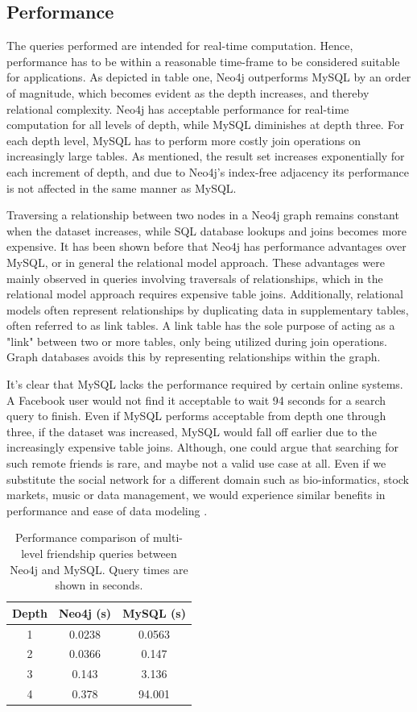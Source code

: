 \documentclass[a4paper, 12pt, conference]{IEEEtran}
\begin{document}
\subsection{Performance}
The queries performed are intended for real-time computation.
Hence, performance has to be within a reasonable time-frame to be considered suitable for applications.
As depicted in table one, Neo4j outperforms MySQL by an order of magnitude, which becomes evident as the depth increases, and thereby relational complexity.
Neo4j has acceptable performance for real-time computation for all levels of depth, while MySQL diminishes at depth three.
For each depth level, MySQL has to perform more costly join operations on increasingly large tables.
As mentioned, the result set increases exponentially for each increment of depth, and due to Neo4j's index-free adjacency its performance is not affected in the same manner as MySQL.

Traversing a relationship between two nodes in a Neo4j graph remains constant when the dataset increases, while SQL database lookups and joins becomes more expensive.
It has been shown before \cite{comparison} that Neo4j has performance advantages over MySQL, or in general the relational model approach.
These advantages were mainly observed in queries involving traversals of relationships, which in the relational model approach requires expensive table joins.
Additionally, relational models often represent relationships by duplicating data in supplementary tables, often referred to as link tables.
A link table has the sole purpose of acting as a "link" between two or more tables, only being utilized during join operations.
Graph databases avoids this by representing relationships within the graph. 
    
It's clear that MySQL lacks the performance required by certain online systems.
A Facebook user would not find it acceptable to wait 94 seconds for a search query to finish.
Even if MySQL performs acceptable from depth one through three, if the dataset was increased, MySQL would fall off earlier due to the increasingly expensive table joins. 
Although, one could argue that searching for such remote friends is rare, and maybe not a valid use case at all.
Even if we substitute the social network for a different domain such as bio-informatics, stock markets, music or data management, we would experience similar benefits in performance and ease of data modeling \cite{graph_book}.
   
\begin{table}[t]
	\centering
	\begin{tabular}{c|c|c}
		\textbf{Depth} & \textbf{Neo4j} (s) & \textbf{MySQL} (s) \\ \hline
		1 & 0.0238 & 0.0563 \\ \hline
		2 & 0.0366 & 0.147 \\ \hline
		3 & 0.143 & 3.136 \\ \hline
		4 & 0.378 & 94.001 \\
	\end{tabular}
	\caption{Performance comparison of multi-level friendship queries between Neo4j and MySQL. Query times are shown in seconds.}
\end{table}
\end{document}
